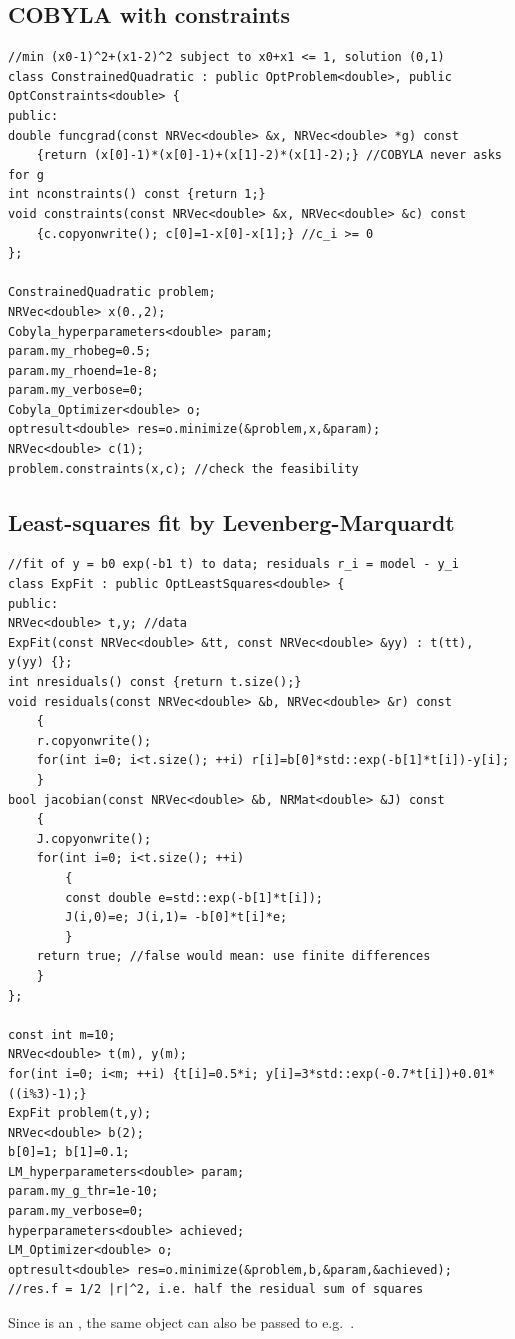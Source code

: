 \subsection{COBYLA with constraints}

\begin{lstlisting}
//min (x0-1)^2+(x1-2)^2 subject to x0+x1 <= 1, solution (0,1)
class ConstrainedQuadratic : public OptProblem<double>, public OptConstraints<double> {
public:
double funcgrad(const NRVec<double> &x, NRVec<double> *g) const
	{return (x[0]-1)*(x[0]-1)+(x[1]-2)*(x[1]-2);} //COBYLA never asks for g
int nconstraints() const {return 1;}
void constraints(const NRVec<double> &x, NRVec<double> &c) const
	{c.copyonwrite(); c[0]=1-x[0]-x[1];} //c_i >= 0
};

ConstrainedQuadratic problem;
NRVec<double> x(0.,2);
Cobyla_hyperparameters<double> param;
param.my_rhobeg=0.5;
param.my_rhoend=1e-8;
param.my_verbose=0;
Cobyla_Optimizer<double> o;
optresult<double> res=o.minimize(&problem,x,&param);
NRVec<double> c(1);
problem.constraints(x,c); //check the feasibility
\end{lstlisting}

\subsection{Least-squares fit by Levenberg-Marquardt}

\begin{lstlisting}
//fit of y = b0 exp(-b1 t) to data; residuals r_i = model - y_i
class ExpFit : public OptLeastSquares<double> {
public:
NRVec<double> t,y; //data
ExpFit(const NRVec<double> &tt, const NRVec<double> &yy) : t(tt), y(yy) {};
int nresiduals() const {return t.size();}
void residuals(const NRVec<double> &b, NRVec<double> &r) const
	{
	r.copyonwrite();
	for(int i=0; i<t.size(); ++i) r[i]=b[0]*std::exp(-b[1]*t[i])-y[i];
	}
bool jacobian(const NRVec<double> &b, NRMat<double> &J) const
	{
	J.copyonwrite();
	for(int i=0; i<t.size(); ++i)
		{
		const double e=std::exp(-b[1]*t[i]);
		J(i,0)=e; J(i,1)= -b[0]*t[i]*e;
		}
	return true; //false would mean: use finite differences
	}
};

const int m=10;
NRVec<double> t(m), y(m);
for(int i=0; i<m; ++i) {t[i]=0.5*i; y[i]=3*std::exp(-0.7*t[i])+0.01*((i%3)-1);}
ExpFit problem(t,y);
NRVec<double> b(2);
b[0]=1; b[1]=0.1;
LM_hyperparameters<double> param;
param.my_g_thr=1e-10;
param.my_verbose=0;
hyperparameters<double> achieved;
LM_Optimizer<double> o;
optresult<double> res=o.minimize(&problem,b,&param,&achieved);
//res.f = 1/2 |r|^2, i.e. half the residual sum of squares
\end{lstlisting}
Since  is an , the same object can also be passed to e.g.\ .

